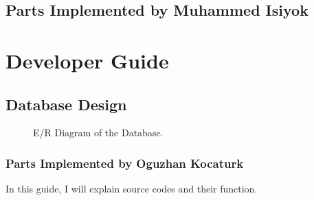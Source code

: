 \documentclass[a4paper,10pt,english]{sphinxmanual}
\begin{document}
\section{Parts Implemented by Muhammed Isiyok}
\label{\detokenize{user/member2:parts-implemented-by-muhammed-isiyok}}\label{\detokenize{user/member2::doc}}

\chapter{Developer Guide}
\label{\detokenize{developer/index:developer-guide}}\label{\detokenize{developer/index::doc}}

\section{Database Design}
\label{\detokenize{developer/index:database-design}}
\begin{figure}[htbp]
\centering
\capstart

\noindent{}
\caption{E/R Diagram of the Database.}\label{\detokenize{developer/index:id1}}\end{figure}


\subsection{Parts Implemented by Oguzhan Kocaturk}
\label{\detokenize{developer/member1:parts-implemented-by-oguzhan-kocaturk}}\label{\detokenize{developer/member1::doc}}
In this guide, I will explain source codes and their function.
\end{document}
